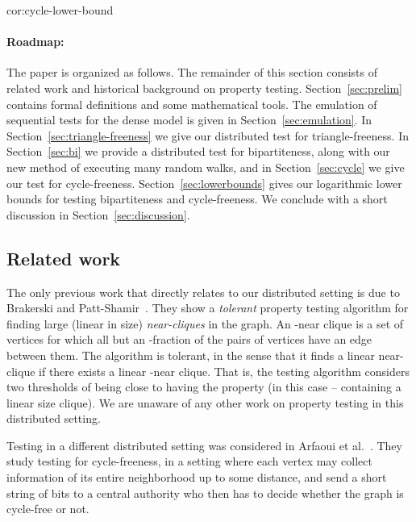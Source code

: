 \documentclass[11pt]{article}
\newenvironment{theorem-repeat}[1]{\begin{trivlist}
		\item[\hspace{\labelsep}{\bf\noindent Theorem \ref{#1} }]\em }{\end{trivlist}}
\begin{document}
\begin{theorem-repeat}{cor:cycle-lower-bound}
\ThmLBCycle
\end{theorem-repeat}
\paragraph{Roadmap:}
The paper is organized as follows. The remainder of this section consists of related work and historical background on property testing.
Section~\ref{sec:prelim} contains formal definitions and some mathematical tools.
The emulation of sequential tests for the dense model is given in Section~\ref{sec:emulation}. In Section~\ref{sec:triangle-freeness} we give our distributed test for triangle-freeness.
In Section~\ref{sec:bi} we provide a distributed test for bipartiteness, along with our new method of executing many random walks, and in Section~\ref{sec:cycle} we give our test for cycle-freeness. Section~\ref{sec:lowerbounds} gives our logarithmic lower bounds for testing bipartiteness and cycle-freeness.
We conclude with a short discussion in Section~\ref{sec:discussion}.

\subsection{Related work}




The only previous work that directly relates to our distributed setting is due to Brakerski and Patt-Shamir~\cite{brakerski2011distributed}. They show a \emph{tolerant} property testing algorithm for finding large (linear in size) \emph{near-cliques} in the graph. An -near clique is a set of vertices for which all but an -fraction of the pairs of vertices have an edge between them. The algorithm is tolerant, in the sense that it finds a linear near-clique if there exists a linear -near clique. That is, the testing algorithm considers two thresholds of being close to having the property (in this case -- containing a linear size clique). We are unaware of any other work on property testing in this distributed setting.

Testing in a different distributed setting was considered in Arfaoui et al.~\cite{ArfaouiFIM14}. They study testing for cycle-freeness, in a setting where each vertex may collect information of its entire neighborhood up to some distance, and send a short string of bits to a central authority who then has to decide whether the graph is cycle-free or not.
\end{document}
